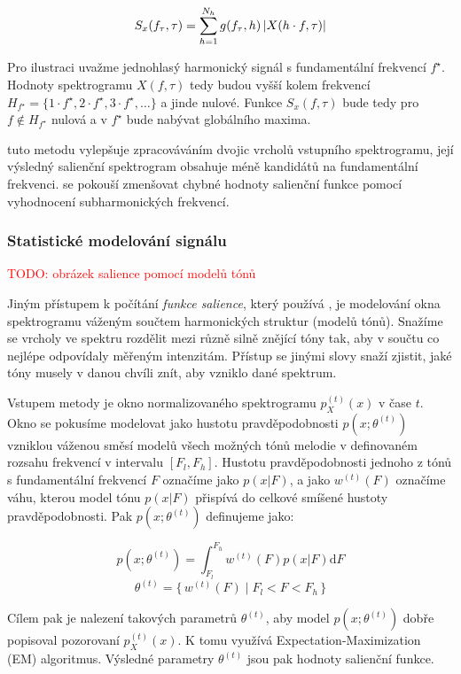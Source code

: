     $$S_x(f_\tau, \tau) = \sum_{h=1}^{N_h}{g(f_\tau, h)\left|{X(h \cdot f, \tau)}\right|}$$

Pro ilustraci uvažme jednohlasý harmonický signál s fundamentální frekvencí $f^\star$. Hodnoty spektrogramu $X(f, \tau)$ tedy budou vyšší kolem frekvencí $H_{f^\star} = \{1\cdot f^\star, 2\cdot f^\star, 3\cdot f^\star, \dots\}$ a jinde nulové. Funkce $S_x(f, \tau)$ bude tedy pro $f \not\in H_{f^\star}$ nulová a v $f^\star$ bude nabývat globálního maxima.

\cite{Dressler2011} tuto metodu vylepšuje zpracováváním dvojic vrcholů vstupního spektrogramu, její výsledný salienční spektrogram obsahuje méně kandidátů na fundamentální frekvenci. \cite{Cancela2008} se pokouší zmenšovat chybné hodnoty salienční funkce pomocí vyhodnocení subharmonických frekvencí.

\subsubsection{Statistické modelování signálu}

\textcolor{red}{TODO: obrázek salience pomocí modelů tónů}

Jiným přístupem k počítání \emph{funkce salience}, který používá \cite{Goto1999}, je modelování okna spektrogramu váženým součtem harmonických struktur (modelů tónů). Snažíme se vrcholy ve spektru rozdělit mezi různě silně znějící tóny tak, aby v součtu co nejlépe odpovídaly měřeným intenzitám. Přístup se jinými slovy snaží zjistit, jaké tóny musely v danou chvíli znít, aby vzniklo dané spektrum. 

Vstupem metody je okno normalizovaného spektrogramu $p_X^{(t)}(x)$ v čase $t$. Okno se pokusíme modelovat jako hustotu pravděpodobnosti $p(x; \theta^{(t)})$ vzniklou váženou směsí modelů všech možných tónů melodie v definovaném rozsahu frekvencí v intervalu $[F_l, F_h]$. Hustotu pravděpodobnosti jednoho z tónů s fundamentální frekvencí $F$ označíme jako $p(x|F)$, a jako $w^{(t)}(F)$ označíme váhu, kterou model tónu $p(x|F)$ přispívá do celkové smíšené hustoty pravděpodobnosti. Pak $p(x; \theta^{(t)})$ definujeme jako:

$$p(x; \theta^{(t)}) = \int_{F_l}^{F_h}{w^{(t)}(F)p(x|F) \mathrm{d}F}$$
$$\theta^{(t)} = \{\, w^{(t)}(F) \mid F_l < F < F_h \,\}$$

Cílem pak je nalezení takových parametrů $\theta^{(t)}$, aby model $p(x; \theta^{(t)})$ dobře popisoval pozorovaní $p_X^{(t)}(x)$. K tomu \cite{Goto1999} využívá Expectation-Maximization (EM) algoritmus. Výsledné parametry $\theta^{(t)}$ jsou pak hodnoty salienční funkce.

